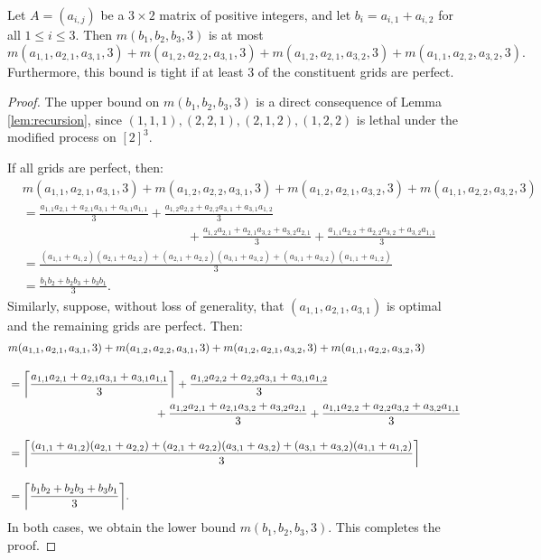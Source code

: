 \begin{cor}
\label{cor:recursion}
Let $A=(a_{i,j})$ be a $3 \times 2$ matrix of positive integers, and let $b_i = a_{i,1} + a_{i,2}$ for all $1 \leq i \leq 3$. Then $m(b_1, b_2, b_3, 3)$ is at most
$$m(a_{1,1}, a_{2,1}, a_{3,1}, 3) +  m(a_{1,2}, a_{2,2}, a_{3,1}, 3) + m(a_{1,2}, a_{2,1}, a_{3,2}, 3) + m(a_{1,1}, a_{2,2}, a_{3,2}, 3).$$
Furthermore, this bound is tight if at least 3 of the constituent grids are perfect. 
\end{cor}

\begin{proof}
The upper bound on $m(b_1, b_2, b_3, 3)$ is a direct consequence of Lemma \ref{lem:recursion}, since $(1,1,1), (2,2,1), (2,1,2), (1,2,2)$ is lethal under the modified process on $[2]^3$. 

If all grids are perfect, then:  
\begin{align*}
&m(a_{1,1}, a_{2,1}, a_{3,1}, 3) +  m(a_{1,2}, a_{2,2}, a_{3,1}, 3) + m(a_{1,2}, a_{2,1}, a_{3,2}, 3) + m(a_{1,1}, a_{2,2}, a_{3,2}, 3) \\[10pt]
&= \frac{a_{1,1}a_{2,1} + a_{2,1}a_{3,1} + a_{3,1}a_{1,1}}{3} + \frac{a_{1,2}a_{2,2} + a_{2,2}a_{3,1} + a_{3,1}a_{1,2}}{3} \\
&\qquad\qquad\qquad\qquad\qquad\qquad\quad + \frac{a_{1,2}a_{2,1} + a_{2,1}a_{3,2} + a_{3,2}a_{2,1}}{3} + \frac{a_{1,1}a_{2,2} + a_{2,2}a_{3,2} + a_{3,2}a_{1,1}}{3} \\[10pt]
&= \frac{(a_{1,1} + a_{1,2})(a_{2,1} + a_{2,2}) + (a_{2,1} + a_{2,2})(a_{3,1} + a_{3,2}) + (a_{3,1} + a_{3,2})(a_{1,1} + a_{1,2})}{3} \\[10pt]
&= \frac{b_1b_2+b_2b_3+b_3b_1}{3}.
\end{align*}
Similarly, suppose, without loss of generality, that $(a_{1,1}, a_{2,1}, a_{3,1})$ is optimal and the remaining grids are perfect. Then:
\begin{align*}
&m(a_{1,1}, a_{2,1}, a_{3,1}, 3) +  m(a_{1,2}, a_{2,2}, a_{3,1}, 3) + m(a_{1,2}, a_{2,1}, a_{3,2}, 3) + m(a_{1,1}, a_{2,2}, a_{3,2}, 3) \\[10pt]
&= \ceil*{\frac{a_{1,1}a_{2,1} + a_{2,1}a_{3,1} + a_{3,1}a_{1,1}}{3}} + \frac{a_{1,2}a_{2,2} + a_{2,2}a_{3,1} + a_{3,1}a_{1,2}}{3} \\
&\qquad\qquad\qquad\qquad\qquad\qquad\quad + \frac{a_{1,2}a_{2,1} + a_{2,1}a_{3,2} + a_{3,2}a_{2,1}}{3} + \frac{a_{1,1}a_{2,2} + a_{2,2}a_{3,2} + a_{3,2}a_{1,1}}{3} \\[10pt]
&= \ceil*{\frac{(a_{1,1} + a_{1,2})(a_{2,1} + a_{2,2}) + (a_{2,1} + a_{2,2})(a_{3,1} + a_{3,2}) + (a_{3,1} + a_{3,2})(a_{1,1} + a_{1,2})}{3}} \\[10pt]
&= \ceil*{\frac{b_1b_2+b_2b_3+b_3b_1}{3}}.
\end{align*}
In both cases, we obtain the lower bound $m(b_1, b_2, b_3, 3)$. This completes the proof. 
\end{proof}

